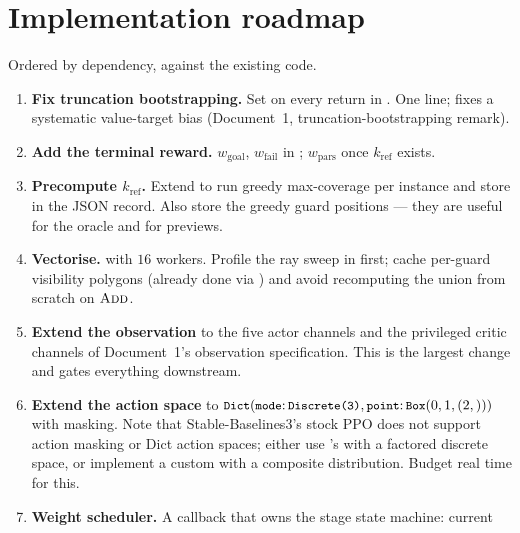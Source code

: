 \documentclass[11pt,a4paper]{article}
\begin{document}
\section{Implementation roadmap}

Ordered by dependency, against the existing code.

\begin{enumerate}[label=\textbf{R\arabic*.},leftmargin=2.7em]
  \item \textbf{Fix truncation bootstrapping.} Set 
        on every  return in . One line; fixes a
        systematic value-target bias (Document~1, truncation-bootstrapping remark).
  \item \textbf{Add the terminal reward.} $w_{\mathrm{goal}}$, $w_{\mathrm{fail}}$ in
        ; $w_{\mathrm{pars}}$ once $k_{\mathrm{ref}}$ exists.
  \item \textbf{Precompute $k_{\mathrm{ref}}$.} Extend  to
        run greedy max-coverage per instance and store  in the JSON record.
        Also store the greedy guard positions --- they are useful for the oracle and for
        previews.
  \item \textbf{Vectorise.}  with $16$ workers. Profile the ray sweep in
         first; cache per-guard visibility polygons (already done via
        ) and avoid recomputing the union from scratch on $\textsc{Add}$.
  \item \textbf{Extend the observation} to the five actor channels and the privileged critic
        channels of Document~1's observation specification. This is the largest change and gates
        everything downstream.
  \item \textbf{Extend the action space} to $\texttt{\small Dict}(\texttt{\small mode}{:}\,\texttt{\small Discrete(3)},
        \texttt{\small point}{:}\,\texttt{\small Box}(0,1,(2,)))$ with masking. Note that Stable-Baselines3's
        stock PPO does not support action masking or Dict action spaces; either use
        's  with a factored discrete space, or implement
        a custom  with a composite distribution. Budget real time
        for this.
  \item \textbf{Weight scheduler.} A callback that owns the stage state machine: current

\end{enumerate}
\end{document}
